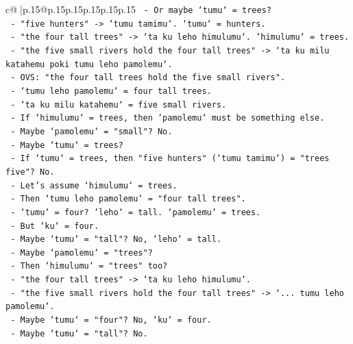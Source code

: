 \documentclass{article}
\begin{document}
{\begin{supertabular}{c@{$\;$}|p{.15\linewidth}@{}p{.15\linewidth}p{.15\linewidth}p{.15\linewidth}p{.15\linewidth}p{.15\linewidth}}
{{{\texttt{                {-} Or maybe `tumu` = trees?} \\
\texttt{                {-} "five hunters" {-}> `tumu tamimu`. `tumu` = hunters.} \\
\texttt{                {-} "the four tall trees" {-}> `ta ku leho himulumu`. `himulumu` = trees.} \\
\texttt{                {-} "the five small rivers hold the four tall trees" {-}> `ta ku milu katahemu poki tumu leho pamolemu`.} \\
\texttt{                  {-} OVS: "the four tall trees hold the five small rivers".} \\
\texttt{                  {-} `tumu leho pamolemu` = four tall trees.} \\
\texttt{                  {-} `ta ku milu katahemu` = five small rivers.} \\
\texttt{                  {-} If `himulumu` = trees, then `pamolemu` must be something else.} \\
\texttt{                  {-} Maybe `pamolemu` = "small"? No.} \\
\texttt{                  {-} Maybe `tumu` = trees?} \\
\texttt{                  {-} If `tumu` = trees, then "five hunters" (`tumu tamimu`) = "trees five"? No.} \\
\texttt{                  {-} Let's assume `himulumu` = trees.} \\
\texttt{                  {-} Then `tumu leho pamolemu` = "four tall trees".} \\
\texttt{                  {-} `tumu` = four? `leho` = tall. `pamolemu` = trees.} \\
\texttt{                  {-} But `ku` = four.} \\
\texttt{                  {-} Maybe `tumu` = "tall"? No, `leho` = tall.} \\
\texttt{                  {-} Maybe `pamolemu` = "trees"?} \\
\texttt{                  {-} Then `himulumu` = "trees" too?} \\
\texttt{                  {-} "the four tall trees" {-}> `ta ku leho himulumu`.} \\
\texttt{                  {-} "the five small rivers hold the four tall trees" {-}> `... tumu leho pamolemu`.} \\
\texttt{                  {-} Maybe `tumu` = "four"? No, `ku` = four.} \\
\texttt{                  {-} Maybe `tumu` = "tall"? No.} \\
}}}
\end{supertabular}}
\end{document}
